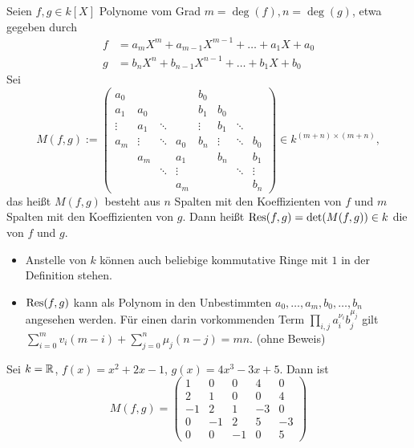 \begin{defn}[Resultante]
	Seien $f,g \in k[X]$ Polynome vom Grad $m = \deg(f), n=\deg(g)$, etwa gegeben durch
	\begin{equation}
	\begin{aligned}
		f &= a_mX^m + a_{m-1}X^{m-1} + \dots + a_1X + a_0 \\
		g &= b_nX^n + b_{n-1}X^{n-1} + \dots + b_1X + b_0
	\end{aligned}
	\end{equation}
	Sei
	\[ M(f,g) := \begin{pmatrix}
	a_0 &  &  &  & b_0 &  &  &  \\ 
	a_1 & a_0 &  &  & b_1 & b_0 &  &  \\ 
	\vdots & a_1 & \ddots &  & \vdots & b_1 & \ddots &  \\ 
	a_m & \vdots & \ddots & a_0 & b_n & \vdots & \ddots & b_0 \\ 
	 & a_m &  & a_1 &  & b_n &  & b_1 \\ 
	 &  & \ddots & \vdots &  &  & \ddots & \vdots \\ 
	 &  &  & a_m &  &  &  & b_n
	\end{pmatrix} \in k^{(m+n) \times (m+n)},\]
	das heißt $M(f,g)$ besteht aus $n$ Spalten mit den Koeffizienten von $f$ und $m$ Spalten mit den Koeffizienten von $g$. Dann heißt $\operatorname{Res}(f,g) = \det(M(f,g)) \in k$ die  von $f$ und $g$.
\end{defn}

\begin{bem}
\label{bem_10.6}
	\begin{itemize}
		\item Anstelle von $k$ können auch beliebige kommutative Ringe mit $1$ in der Definition stehen.
		\item $\operatorname{Res}(f,g)$ kann als Polynom in den Unbestimmten $a_0,\dots,a_m, b_0, \dots, b_n$ angesehen werden. Für einen darin vorkommenden Term $\prod_{i,j} a_i^{\nu_i} b_j^{\mu_j}$ gilt $\sum_{i=0}^{m} v_i (m-i) + \sum_{j=0}^{n} \mu_j (n-j) = mn$. (ohne Beweis)
	\end{itemize}
\end{bem}

\begin{bsp}
	Sei $k = \mathbb{R}$, $f(x) = x^2+2x-1$, $g(x) = 4x^3 - 3x + 5$. Dann ist
	\[
		M(f,g) = \begin{pmatrix}
		1 & 0 & 0 & 4 & 0 \\ 
		2 & 1 & 0 & 0 & 4 \\ 
		-1 & 2 & 1 & -3 & 0 \\ 
		0 & -1 & 2 & 5 & -3 \\ 
		0 & 0 & -1 & 0 & 5
		\end{pmatrix} 
	\]
\end{bsp}

